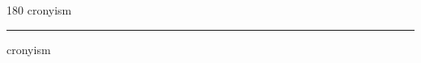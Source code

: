 
\begin{frame}
\begin{center}
\begin{turn}{180}
{\fontsize{2.5cm}{1em}\selectfont cronyism}
\end{turn}
\vspace{1em}\par  
\hrule
\vspace{1em}\par  
{\fontsize{2.5cm}{1em}\selectfont cronyism}
\end{center}
\end{frame}
